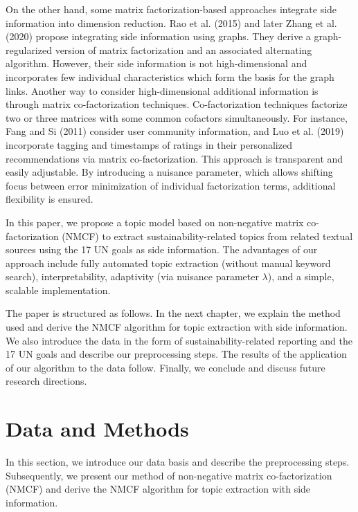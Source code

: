 \documentclass[
]{article}
\begin{document}
On the other hand, some matrix factorization-based approaches integrate side information into dimension reduction. Rao et al. (2015) and later Zhang et al. (2020) propose integrating side information using graphs. They derive a graph-regularized version of matrix factorization and an associated alternating algorithm. However, their side information is not high-dimensional and incorporates few individual characteristics which form the basis for the graph links. Another way to consider high-dimensional additional information is through matrix co-factorization techniques. Co-factorization techniques factorize two or three matrices with some common cofactors simultaneously. For instance, Fang and Si (2011) consider user community information, and Luo et al. (2019) incorporate tagging and timestamps of ratings in their personalized recommendations via matrix co-factorization. This approach is transparent and easily adjustable. By introducing a nuisance parameter, which allows shifting focus between error minimization of individual factorization terms, additional flexibility is ensured.

In this paper, we propose a topic model based on non-negative matrix co-factorization (NMCF) to extract sustainability-related topics from related textual sources using the 17 UN goals as side information. The advantages of our approach include fully automated topic extraction (without manual keyword search), interpretability, adaptivity (via nuisance parameter \(\lambda\)), and a simple, scalable implementation.

The paper is structured as follows. In the next chapter, we explain the method used and derive the NMCF algorithm for topic extraction with side information. We also introduce the data in the form of sustainability-related reporting and the 17 UN goals and describe our preprocessing steps. The results of the application of our algorithm to the data follow. Finally, we conclude and discuss future research directions.

\hypertarget{data-and-methods}{%
\section{Data and Methods}\label{data-and-methods}}

In this section, we introduce our data basis and describe the preprocessing steps. Subsequently, we present our method of non-negative matrix co-factorization (NMCF) and derive the NMCF algorithm for topic extraction with side information.
\end{document}
